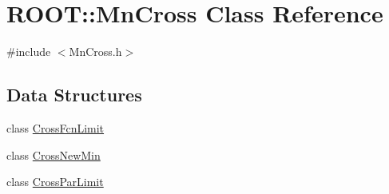\hypertarget{classROOT_1_1Minuit2_1_1MnCross}{}\section{R\+O\+OT\+:\+:Mn\+Cross Class Reference}
\label{classROOT_1_1Minuit2_1_1MnCross}


{\ttfamily \#include $<$Mn\+Cross.\+h$>$}

\subsection*{Data Structures}
\begin{DoxyCompactItemize}
\item 
class \mbox{\hyperlink{classROOT_1_1Minuit2_1_1MnCross_1_1CrossFcnLimit}{Cross\+Fcn\+Limit}}
\item 
class \mbox{\hyperlink{classROOT_1_1Minuit2_1_1MnCross_1_1CrossNewMin}{Cross\+New\+Min}}
\item 
class \mbox{\hyperlink{classROOT_1_1Minuit2_1_1MnCross_1_1CrossParLimit}{Cross\+Par\+Limit}}
\end{DoxyCompactItemize}
